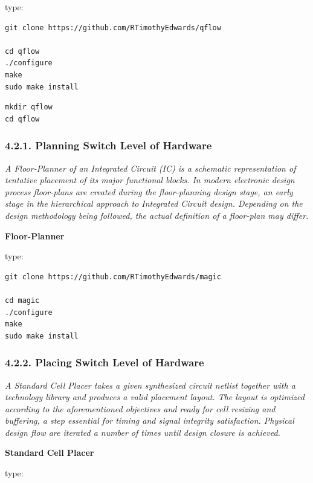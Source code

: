 \documentclass[
]{article}
\begin{document}
type:

\begin{verbatim}
git clone https://github.com/RTimothyEdwards/qflow

cd qflow
./configure
make
sudo make install
\end{verbatim}

\begin{verbatim}
mkdir qflow
cd qflow
\end{verbatim}

\hypertarget{planning-switch-level-of-hardware-1}{%
\subsubsection{4.2.1. Planning Switch Level of
Hardware}\label{planning-switch-level-of-hardware-1}}

\emph{A Floor-Planner of an Integrated Circuit (IC) is a schematic
representation of tentative placement of its major functional blocks. In
modern electronic design process floor-plans are created during the
floor-planning design stage, an early stage in the hierarchical approach
to Integrated Circuit design. Depending on the design methodology being
followed, the actual definition of a floor-plan may differ.}

\textbf{Floor-Planner}

type:

\begin{verbatim}
git clone https://github.com/RTimothyEdwards/magic

cd magic
./configure
make
sudo make install
\end{verbatim}

\hypertarget{placing-switch-level-of-hardware-1}{%
\subsubsection{4.2.2. Placing Switch Level of
Hardware}\label{placing-switch-level-of-hardware-1}}

\emph{A Standard Cell Placer takes a given synthesized circuit netlist
together with a technology library and produces a valid placement
layout. The layout is optimized according to the aforementioned
objectives and ready for cell resizing and buffering, a step essential
for timing and signal integrity satisfaction. Physical design flow are
iterated a number of times until design closure is achieved.}

\textbf{Standard Cell Placer}

type:
\end{document}
